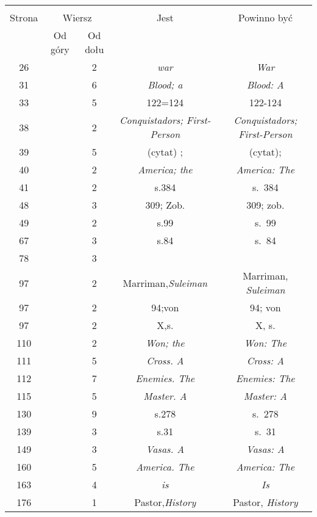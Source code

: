 \documentclass[a4paper,11pt]{article}
\begin{document}
\begin{center}
  \begin{tabular}{|c|c|c|c|c|}
    \hline
    & \multicolumn{2}{c|}{} & & \\
    Strona & \multicolumn{2}{c|}{Wiersz} & Jest
                              & Powinno być \\ \cline{2-3}
    & Od góry & Od dołu & & \\
    \hline
    26  & &  2 & \emph{war} & \emph{War} \\
    31  & &  6 & \emph{Blood; a} & \emph{Blood: A} \\
    33  & &  5 & 122=124 & 122-124 \\
    38  & &  2 & \emph{Conquistadors; First-Person}
           & \emph{Conquistadors; First-Person} \\
    39  & &  5 & (cytat) ; & (cytat); \\
    40  & &  2 & \emph{America; the} & \emph{America: The} \\
    41  & &  2 & s.384 & s.~384 \\
    48  & &  3 & 309; Zob. & 309; zob. \\
    49  & &  2 & s.99 & s.~99 \\
    67  & &  3 & s.84 & s.~84 \\
    78  & &  3 & & \\
    97  & &  2 & Marriman,\emph{Suleiman} & Marriman, \emph{Suleiman} \\
    97  & &  2 & 94;von & 94; von\\
    97  & &  2 & X,s.& X, s. \\
    110 & &  2 & \emph{Won; the} & \emph{Won: The} \\
    111 & &  5 & \emph{Cross. A} & \emph{Cross: A} \\
    112 & &  7 & \emph{Enemies. The} & \emph{Enemies: The} \\
    115 & &  5 & \emph{Master. A} & \emph{Master: A} \\
    130 & &  9 & s.278 & s.~278 \\
    139 & &  3 & s.31 & s.~31 \\
    149 & &  3 & \emph{Vasas. A} & \emph{Vasas: A} \\
    160 & &  5 & \emph{America. The} & \emph{America: The} \\
    163 & &  4 & \emph{is} & \emph{Is} \\
    176 & &  1 & Pastor,\emph{History} & Pastor, \emph{History} \\

\end{tabular}
\end{center}
\end{document}
